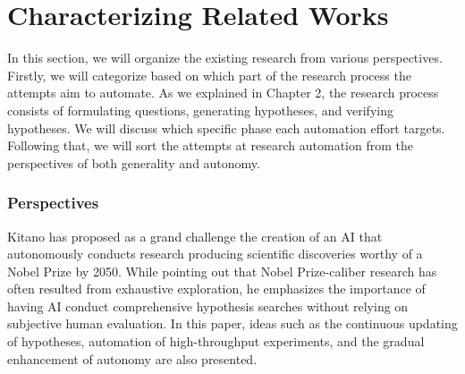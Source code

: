 
\section{Characterizing Related Works}
In this section, we will organize the existing research from various perspectives. Firstly, we will categorize based on which part of the research process the attempts aim to automate. As we explained in Chapter 2, the research process consists of formulating questions, generating hypotheses, and verifying hypotheses. We will discuss which specific phase each automation effort targets. Following that, we will sort the attempts at research automation from the perspectives of both generality and autonomy.

\subsubsection{Perspectives}

Kitano \cite{kitano2021nobel} has proposed as a grand challenge the creation of an AI that autonomously conducts research producing scientific discoveries worthy of a Nobel Prize by 2050. While pointing out that Nobel Prize-caliber research has often resulted from exhaustive exploration, he emphasizes the importance of having AI conduct comprehensive hypothesis searches without relying on subjective human evaluation. In this paper, ideas such as the continuous updating of hypotheses, automation of high-throughput experiments, and the gradual enhancement of autonomy are also presented.

